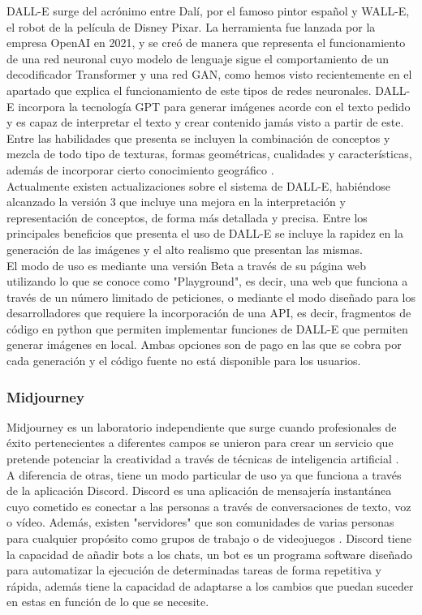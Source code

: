 DALL-E surge del acrónimo entre Dalí, por el famoso pintor español y WALL-E, el robot de la película de Disney Pixar. La herramienta fue lanzada por la empresa OpenAI en 2021, y se creó de manera que representa el funcionamiento de una red neuronal cuyo modelo de lenguaje sigue el comportamiento de un decodificador Transformer y una red GAN, como hemos visto recientemente en el apartado que explica el funcionamiento de este tipos de redes neuronales. DALL-E incorpora la tecnología GPT para generar imágenes acorde con el texto pedido y es capaz de interpretar el texto y crear contenido jamás visto a partir de este. Entre las habilidades que presenta se incluyen la combinación de conceptos y mezcla de todo tipo de texturas, formas geométricas, cualidades y características, además de incorporar cierto conocimiento geográfico \citep{dalle}. \\

Actualmente existen actualizaciones sobre el sistema de DALL-E, habiéndose alcanzado la versión 3 que incluye una mejora en la interpretación y representación de conceptos, de forma más detallada y precisa. Entre los principales beneficios que presenta el uso de DALL-E se incluye la rapidez en la generación de las imágenes y el alto realismo que presentan las mismas. \\

El modo de uso es mediante una versión Beta a través de su página web utilizando lo que se conoce como "Playground", es decir, una  web que funciona a través de un número limitado de peticiones, o mediante el modo diseñado para los desarrolladores que requiere la incorporación de una API, es decir, fragmentos de código en python que permiten implementar funciones de DALL-E que permiten generar imágenes en local. Ambas opciones son de pago en las que se cobra por cada generación y el código fuente no está disponible para los usuarios. 

\subsubsection{Midjourney}

Midjourney es un laboratorio independiente que surge cuando profesionales de éxito pertenecientes a diferentes campos se unieron para crear un servicio que pretende potenciar la creatividad a través de técnicas de inteligencia artificial \citep{midjourney}. \\

A diferencia de otras, tiene un modo particular de uso ya que funciona a través de la aplicación Discord. Discord es una aplicación de mensajería instantánea cuyo cometido es conectar a las personas a través de conversaciones de texto, voz o vídeo. Además, existen "servidores" que son comunidades de varias personas para cualquier propósito como grupos de trabajo o de videojuegos \citep{discord}. Discord tiene la capacidad de añadir bots a los chats, un bot es un programa software diseñado para automatizar la ejecución de determinadas tareas de forma repetitiva y rápida, además tiene la capacidad de adaptarse a los cambios que puedan suceder en estas en función de lo que se necesite.\\

